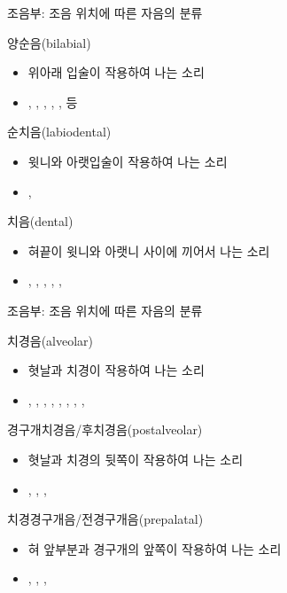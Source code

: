 \documentclass[11pt, aspectratio=169]{beamer}
\newcommand{\textds}[1]{{\ipafont #1}}
\begin{document}
\begin{frame}[t]{조음부: 조음 위치에 따른 자음의 분류}
    \begin{block}{양순음(bilabial)}
        \begin{itemize}
            \item 위아래 입술이 작용하여 나는 소리
            \item \textds{[p]}, \textds{[b]}, \textds{[m]}, \textds{[ɸ]}, \textds{[β]}, \textds{[ʙ]} 등
        \end{itemize}
    \end{block}
    \begin{block}{순치음(labiodental)}
        \begin{itemize}
            \item 윗니와 아랫입술이 작용하여 나는 소리
            \item \textds{[f]}, \textds{[v]}
        \end{itemize}
    \end{block}
    \begin{block}{치음(dental)}
        \begin{itemize}
            \item 혀끝이 윗니와 아랫니 사이에 끼어서 나는 소리
            \item \textds{[θ]}, \textds{[ð]}, \textds{[t̪]}, \textds{[d̪]}, \textds{[s̪]}, \textds{[z̪]}
        \end{itemize}
    \end{block}
\end{frame}

\begin{frame}[t]{조음부: 조음 위치에 따른 자음의 분류}
    \begin{block}{치경음(alveolar)}
        \begin{itemize}
            \item 혓날과 치경이 작용하여 나는 소리
            \item \textds{[t]}, \textds{[d]}, \textds{[n]}, \textds{[s]}, \textds{[z]}, \textds{[ɾ]}, \textds{[r]}, \textds{[ɹ]}, \textds{[l]}
        \end{itemize}
    \end{block}
    \begin{block}{경구개치경음/후치경음(postalveolar)}
        \begin{itemize}
            \item 혓날과 치경의 뒷쪽이 작용하여 나는 소리
            \item \textds{[ʃ]}, \textds{[ʃʷ]} \textds{[ʒ]}, \textds{[tʃ]}, \textds{[dʒ]}
        \end{itemize}
    \end{block}
    \begin{block}{치경경구개음/전경구개음(prepalatal)}
        \begin{itemize}
            \item 혀 앞부분과 경구개의 앞쪽이 작용하여 나는 소리
            \item \textds{[ɕ]}, \textds{[ʑ]}, \textds{[t̠͡ɕ]}, \textds{[d̠͡ʑ]}
        \end{itemize}
    \end{block}
\end{frame}
\end{document}
